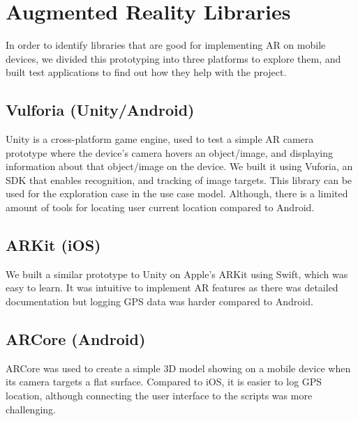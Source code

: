 
\section{Augmented Reality Libraries}
In order to identify libraries that are good for implementing AR on mobile devices, we divided this prototyping into three platforms to explore them, and built test applications to find out how they help with the project.

\subsection*{Vulforia (Unity/Android)}
Unity is a cross-platform game engine, used to test a simple AR camera prototype where the device's camera hovers an object/image, and displaying information about that object/image on the device. We built it using Vuforia, an SDK that enables recognition, and tracking of image targets. This library can be used for the exploration case in the use case model. Although, there is a limited amount of tools for locating user current location compared to Android.

\subsection*{ARKit (iOS)}
We built a similar prototype to Unity on Apple's ARKit using Swift, which was easy to learn. It was intuitive to implement AR features as there was detailed documentation but logging GPS data was harder compared to Android.

\subsection*{ARCore (Android)}
ARCore was used to create a simple 3D model showing on a mobile device when its camera targets a flat surface. Compared to iOS, it is easier to log GPS location, although connecting the user interface to the scripts was more challenging.

